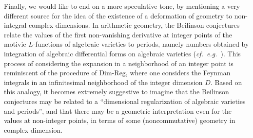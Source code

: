 \documentclass[10pt]{amsart}
\newcommand{\eg}{{\it e.g.\/}\ }
\newcommand{\cf}{{\it cf.\/}\ }
\numberwithin{equation}{section}
\begin{document}
\smallskip

Finally, we would like to end on a more speculative tone, by
mentioning a very different source for the idea of the existence
of a deformation of geometry to non-integral complex dimensions.
In arithmetic geometry, the Beilinson conjectures relate the
values of the first non-vanishing derivative at integer points of
the motivic $L$-functions of algebraic varieties to periods,
namely numbers obtained by integration of algebraic differential
forms on algebraic varieties (\cf \eg \cite{KoZa}). This process
of considering the expansion in a neighborhood of an integer point
is reminiscent of the procedure of Dim-Reg, where one considers
the Feynman integrals in an infinitesimal neighborhood of the
integer dimension $D$. Based on this analogy, it becomes extremely
suggestive to imagine that the Beilinson conjectures may be
related to a ``dimensional regularization of algebraic varieties
and periods'', and that there may be a geometric interpretation
even for the values at non-integer points, in terms of some
(noncommutative) geometry in complex dimension.
\end{document}
